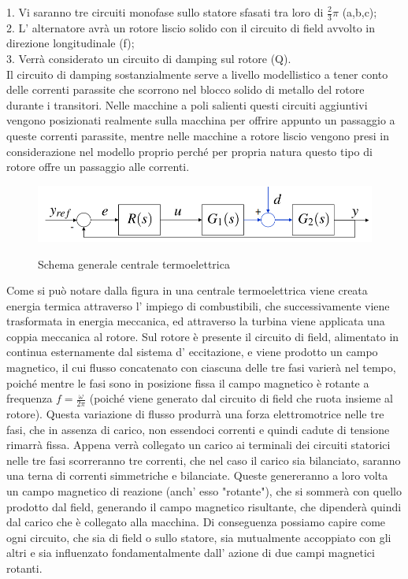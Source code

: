 \documentclass[Lau,noexaminfo]{sapthesis}
\begin{document}
	1. Vi saranno tre circuiti monofase sullo statore sfasati tra loro di $\frac{2}{3}\pi$ (a,b,c);\\
	2. L' alternatore avrà un rotore liscio solido con il circuito di field avvolto in direzione longitudinale (f);\\
	3. Verrà considerato un circuito di damping sul rotore (Q).\\
	Il circuito di damping sostanzialmente serve a livello modellistico a tener conto delle correnti parassite che scorrono nel blocco solido di metallo del rotore durante i transitori. Nelle macchine a poli salienti questi circuiti aggiuntivi vengono posizionati realmente sulla macchina per offrire appunto un passaggio a queste correnti parassite, mentre nelle macchine a rotore liscio vengono presi in considerazione nel modello proprio perché per propria natura questo tipo di rotore offre un passaggio alle correnti.\\
	\begin{figure}
		\centering
		\includegraphics[height=0.3\textheight]{schema_generale}\\
		\caption{Schema generale centrale termoelettrica}
	\end{figure}
	
	Come si può notare dalla figura in una centrale termoelettrica viene creata energia termica attraverso l' impiego di combustibili, che successivamente viene trasformata in energia meccanica, ed attraverso la turbina viene applicata una coppia meccanica al rotore. Sul rotore è presente il circuito di field, alimentato in continua esternamente dal sistema d' eccitazione, e viene prodotto un campo magnetico, il cui flusso concatenato con ciascuna delle tre fasi varierà nel tempo, poiché mentre le fasi sono in posizione fissa il campo magnetico è rotante a frequenza $f=\frac{\omega}{2\pi}$ (poiché viene generato dal circuito di field che ruota insieme al rotore). Questa variazione di flusso produrrà una forza elettromotrice nelle tre fasi, che in assenza di carico, non essendoci correnti e quindi cadute di tensione rimarrà fissa. Appena verrà collegato un carico ai terminali dei circuiti statorici nelle tre fasi scorreranno tre correnti, che nel caso il carico sia bilanciato, saranno una terna di correnti simmetriche e bilanciate. Queste genereranno a loro volta un campo magnetico di reazione (anch' esso "rotante"), che si sommerà con quello prodotto dal field, generando il campo magnetico risultante, che dipenderà quindi dal carico che è collegato alla macchina. Di conseguenza possiamo capire come ogni circuito, che sia di field o sullo statore, sia mutualmente accoppiato con gli altri e sia influenzato fondamentalmente dall' azione di due campi magnetici rotanti.
\end{document}
